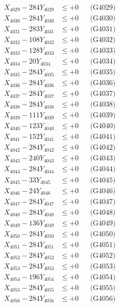 \documentclass[a4paper,10pt]{article}
\begin{document}
{\begin{align}
X_{4029} - 284Y_{4029} &\leq +0 && \text{(G4029)} \\
X_{4030} - 284Y_{4030} &\leq +0 && \text{(G4030)} \\
\allowbreak
X_{4031} - 283Y_{4031} &\leq +0 && \text{(G4031)} \\
X_{4032} - 108Y_{4032} &\leq +0 && \text{(G4032)} \\
X_{4033} - 128Y_{4033} &\leq +0 && \text{(G4033)} \\
X_{4034} - 20Y_{4034} &\leq +0 && \text{(G4034)} \\
X_{4035} - 284Y_{4035} &\leq +0 && \text{(G4035)} \\
X_{4036} - 284Y_{4036} &\leq +0 && \text{(G4036)} \\
X_{4037} - 284Y_{4037} &\leq +0 && \text{(G4037)} \\
X_{4038} - 284Y_{4038} &\leq +0 && \text{(G4038)} \\
X_{4039} - 111Y_{4039} &\leq +0 && \text{(G4039)} \\
X_{4040} - 123Y_{4040} &\leq +0 && \text{(G4040)} \\
\allowbreak
X_{4041} - 152Y_{4041} &\leq +0 && \text{(G4041)} \\
X_{4042} - 284Y_{4042} &\leq +0 && \text{(G4042)} \\
X_{4043} - 240Y_{4043} &\leq +0 && \text{(G4043)} \\
X_{4044} - 284Y_{4044} &\leq +0 && \text{(G4044)} \\
X_{4045} - 33Y_{4045} &\leq +0 && \text{(G4045)} \\
X_{4046} - 24Y_{4046} &\leq +0 && \text{(G4046)} \\
X_{4047} - 284Y_{4047} &\leq +0 && \text{(G4047)} \\
X_{4048} - 284Y_{4048} &\leq +0 && \text{(G4048)} \\
X_{4049} - 136Y_{4049} &\leq +0 && \text{(G4049)} \\
X_{4050} - 284Y_{4050} &\leq +0 && \text{(G4050)} \\
\allowbreak
X_{4051} - 284Y_{4051} &\leq +0 && \text{(G4051)} \\
X_{4052} - 284Y_{4052} &\leq +0 && \text{(G4052)} \\
X_{4053} - 284Y_{4053} &\leq +0 && \text{(G4053)} \\
X_{4054} - 196Y_{4054} &\leq +0 && \text{(G4054)} \\
X_{4055} - 284Y_{4055} &\leq +0 && \text{(G4055)} \\
X_{4056} - 284Y_{4056} &\leq +0 && \text{(G4056)} \\

\end{align}}
\end{document}
